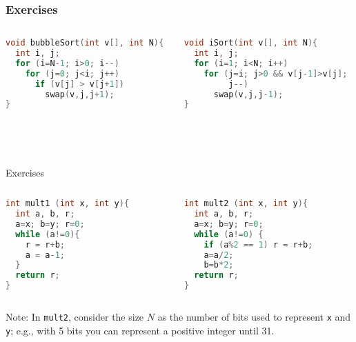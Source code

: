 \documentclass[aspectratio=169]{beamer}
\begin{document}
\begin{frame}[fragile]\frametitle{Exercises}
  
\begin{columns}
\begin{column}{0.48\textwidth}
\begin{lstlisting}[language=C++,emph={bubbleSort,swap}]
void bubbleSort(int v[], int N){
  int i, j;
  for (i=N-1; i>0; i--)
    for (j=0; j<i; j++)
      if (v[j] > v[j+1])
        swap(v,j,j+1);
}
\end{lstlisting}
\end{column}
\begin{column}{0.48\textwidth}
\begin{lstlisting}[language=C++,emph={iSort,swap}]
void iSort(int v[], int N){
  int i, j;
  for (i=1; i<N; i++)
    for (j=i; j>0 && v[j-1]>v[j];
         j--)
      swap(v,j,j-1);
}
\end{lstlisting}
\end{column}
\end{columns}

~\\[-12mm]
~\\[-12mm]
\end{frame}

\begin{frame}[fragile]{Exercises}
  
\begin{columns}
\begin{column}{0.48\textwidth}
\begin{lstlisting}[language=C++,emph={mult1}]
int mult1 (int x, int y){
  int a, b, r;
  a=x; b=y; r=0;
  while (a!=0){
    r = r+b;
    a = a-1;
  }
  return r;
}
\end{lstlisting}
\end{column}
\begin{column}{0.48\textwidth}
\begin{lstlisting}[language=C++,emph={mult2}]
int mult2 (int x, int y){
  int a, b, r;
  a=x; b=y; r=0;
  while (a!=0) {
    if (a%2 == 1) r = r+b;
    a=a/2;
    b=b*2;
  return r;
}
\end{lstlisting}
\end{column}
\end{columns}
Note: In \texttt{mult2}, consider the size $N$ as the number of bits used to represent \texttt{x} and \texttt{y}; e.g., with 5 bits you can represent a positive integer until 31.

\end{frame}
\end{document}
